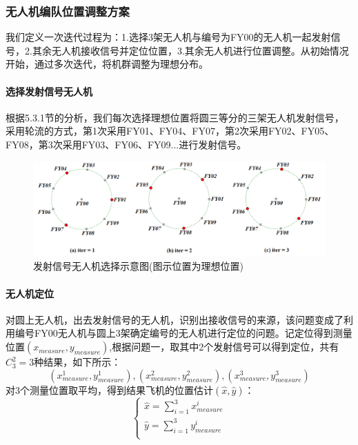 \documentclass[withoutpreface,bwprint]{cumcmthesis} %
\begin{document}
			\subsubsection{无人机编队位置调整方案}
			我们定义一次迭代过程为：1.选择3架无人机与编号为FY00的无人机一起发射信号，2.其余无人机接收信号并定位位置，3.其余无人机进行位置调整。从初始情况开始，通过多次迭代，将机群调整为理想分布。
			\paragraph{选择发射信号无人机}
			根据5.3.1节的分析，我们每次选择理想位置将圆三等分的三架无人机发射信号，采用轮流的方式，第1次采用FY01、FY04、FY07，第2次采用FY02、FY05、FY08，第3次采用FY03、FY06、FY09...进行发射信号。
			\begin{figure}[htb]
				\centering
				\includegraphics[width=1.0\linewidth]{./figures/发射信号无人机示意图}
				\caption{发射信号无人机选择示意图(图示位置为理想位置)}
				\label{发射信号飞机}
			\end{figure}
			\paragraph{无人机定位}
			对圆上无人机，出去发射信号的无人机，识别出接收信号的来源，该问题变成了利用编号FY00无人机与圆上3架确定编号的无人机进行定位的问题。记定位得到测量位置$(x_{measure},y_{measure})$,根据问题一，取其中2个发射信号可以得到定位，共有$C^2_3=3$种结果，如下所示：
			$$(x_{measure}^1,y_{measure}^1),(x_{measure}^2,y_{measure}^2),(x_{measure}^3,y_{measure}^3)$$
			对3个测量位置取平均，得到结果飞机的位置估计$(\hat{x},\hat{y})$：
			$$
			\left\{ \begin{array}{l}  \hat{x}=\sum_{i=1}^3{x_{measure}^{i}}\\  \hat{y}=\sum_{i=1}^3{y_{measure}^{i}}\\ \end{array} \right.  
			$$
			
\end{document}
